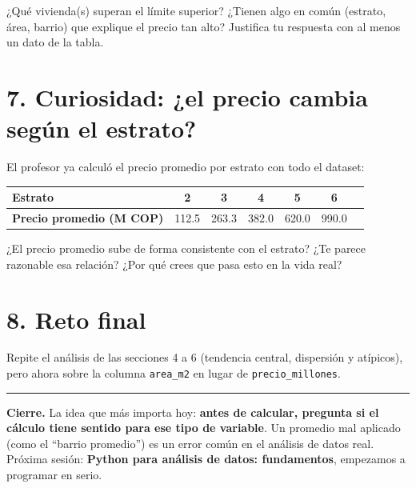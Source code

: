 \documentclass[11pt]{article}
\begin{document}
\begin{espacio}[5.5cm]
\end{espacio}

\begin{pregunta}
¿Qué vivienda(s) superan el límite superior? ¿Tienen algo en común
(estrato, área, barrio) que explique el precio tan alto? Justifica tu
respuesta con al menos un dato de la tabla.
\end{pregunta}
\begin{espacio}[3.5cm]
\end{espacio}

\section*{7. Curiosidad: ¿el precio cambia según el estrato?}

El profesor ya calculó el precio promedio por estrato con todo el
dataset:

\begin{center}
\small
\begin{tabular}{@{}lcccccc@{}}
\toprule
\textbf{Estrato} & 2 & 3 & 4 & 5 & 6 \\
\midrule
\textbf{Precio promedio (M COP)} & 112.5 & 263.3 & 382.0 & 620.0 & 990.0 \\
\bottomrule
\end{tabular}
\end{center}

\begin{pregunta}
¿El precio promedio sube de forma consistente con el estrato? ¿Te parece
razonable esa relación? ¿Por qué crees que pasa esto en la vida real?
\end{pregunta}
\begin{espacio}[3.5cm]
\end{espacio}

\vspace{10pt}
\section*{8. Reto final}

Repite el análisis de las secciones 4 a 6 (tendencia central, dispersión
y atípicos), pero ahora sobre la columna \texttt{area\_m2} en lugar de
\texttt{precio\_millones}.

\begin{espacio}[9cm]
\end{espacio}

\vspace{6pt}
{\color{esumerOrange}\rule{\textwidth}{1pt}}
\vspace{6pt}

\textbf{Cierre.} La idea que más importa hoy: \textbf{antes de calcular,
pregunta si el cálculo tiene sentido para ese tipo de variable}. Un
promedio mal aplicado (como el ``barrio promedio'') es un error común en
el análisis de datos real. Próxima sesión: \textbf{Python para análisis
de datos: fundamentos}, empezamos a programar en serio.
\end{document}
